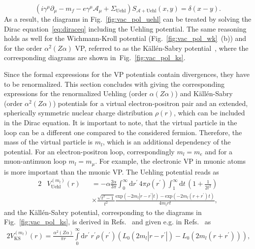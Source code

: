 \begin{equation}
\left(i\gamma^\mu \partial_\mu -m_f - e \gamma^\mu \mathcal{A}_\mu + \Sigma_{\text{Uehl}}\right)S_{\mathcal{A}+\text{Uehl}}(x,y)=\delta(x-y).
\label{eq:uehlprop}
\end{equation}
As a result, the diagrams in Fig.~\ref{fig:vac_pol_uehl} can be treated by solving the Dirac equation~\eqref{eq:diraceq} including the Uehling potential. The same reasoning holds as well for the Wichmann-Kroll potential (Fig.~\ref{fig:vac_pol_wk}~(b)) and for the order $\alpha^2(Z\alpha)$ VP, referred to as the Källén-Sabry potential~\cite{kallen1955}, where the corresponding diagrams are shown in~Fig.~\ref{fig:vac_pol_ks}. 

Since the formal expressions for the VP potentials contain divergences, they have to be renormalized. This section concludes with giving the corresponding expressions for the renormalized Uehling (order $\alpha(Z\alpha)$) and Källén-Sabry (order $\alpha^2(Z\alpha)$) potentials for a virtual electron-positron pair and an extended, spherically symmetric nuclear charge distribution $\rho(r)$, which can be included in the Dirac equation. It is important to note, that the virtual particle in the loop can be a different one compared to the considered fermion. Therefore, the mass of the virtual particle is $m_l$, which is an additional dependency of the potential. For an electron-positron loop, correspondingly $m_l=m_e$ and for a muon-antimuon loop $m_l=m_\mu$. For example, the electronic VP in muonic atoms is more important than the muonic VP. The Uehling potential reads as~\cite{Fullerton1976,Elizarov2005}
\begin{alignat}{2}
&V^{(m_l)}_{\text{Uehl}}(r)&&=-\alpha \frac{2\alpha}{3\pi}\int_0^\infty \text{d}r^{\prime}\,4\pi \rho(r^\prime)\int_1^\infty \text{d}t\,\left( 1+\frac{1}{2t^2} \right)\nonumber\\[7.5pt]
&&&\times\frac{\sqrt{t^2-1}}{t^2} \frac{\text{exp}(-2m_l|r-r^\prime|t)-\text{exp}(-2m_l(r+r^\prime)t)}{4m_lr t},
\label{eq:uehlPot}
\end{alignat}
and the Källén-Sabry potential, corresponding to the diagrams in Fig.~\ref{fig:vac_pol_ks}, is derived in Refs.~\cite{Barbieri1970,Barbieri1972,Barbieri1972_2,Barbieri1973} and given e.g. in Refs.~\cite{indelicato2013,Fullerton1976} as
\begin{alignat}{2}
V^{(m_l)}_{\text{KS}}(r)=\frac{\alpha^2(Z\alpha)}{\pi r}\int\limits_0^\infty\text{d}r^\prime\,r^\prime \rho(r^\prime)\left( L_0(2m_l|r-r^\prime|)-L_0(2m_l(r+r^\prime))\right),\label{eq:KSPot}
\end{alignat}
